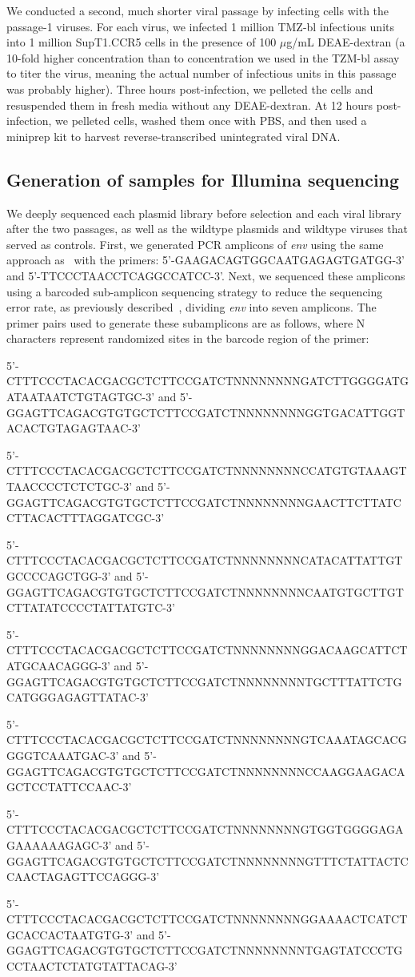 \documentclass[9pt]{elife}
\begin{document}
We conducted a second, much shorter viral passage by infecting cells with the passage-1 viruses.
For each virus, we infected 1 million TMZ-bl infectious units into 1 million SupT1.CCR5 cells in the presence of 100 $\mu$g/mL DEAE-dextran (a 10-fold higher concentration than to concentration we used in the TZM-bl assay to titer the virus, meaning the actual number of infectious units in this passage was probably higher).
Three hours post-infection, we pelleted the cells and resuspended them in fresh media without any DEAE-dextran.
At 12 hours post-infection, we pelleted cells, washed them once with PBS, and then used a miniprep kit to harvest reverse-transcribed unintegrated viral DNA.

\subsection{Generation of samples for Illumina sequencing}
We deeply sequenced each plasmid library before selection and each viral library after the two passages, as well as the wildtype plasmids and wildtype viruses that served as controls.
First, we generated PCR amplicons of \textit{env} using the same approach as~\cite{dingens2017comprehensive} with the primers: 5'-GAAGACAGTGGCAATGAGAGTGATGG-3' and 5'-TTCCCTAACCTCAGGCCATCC-3'.
Next, we sequenced these amplicons using a barcoded sub-amplicon sequencing strategy to reduce the sequencing error rate, as previously described~\cite{doud2016accurate,haddox2016experimental}, dividing \textit{env} into seven amplicons.
The primer pairs used to generate these subamplicons are as follows, where N characters represent randomized sites in the barcode region of the primer:

\begin{itemize}
{\footnotesize
\item 5'-CTTTCCCTACACGACGCTCTTCCGATCTNNNNNNNNGATCTTGGGGATGATAATAATCTGTAGTGC-3' and 5'-GGAGTTCAGACGTGTGCTCTTCCGATCTNNNNNNNNGGTGACATTGGTACACTGTAGAGTAAC-3'
\item 5'-CTTTCCCTACACGACGCTCTTCCGATCTNNNNNNNNCCATGTGTAAAGTTAACCCCTCTCTGC-3' and 5'-GGAGTTCAGACGTGTGCTCTTCCGATCTNNNNNNNNGAACTTCTTATCCTTACACTTTAGGATCGC-3'
\item 5'-CTTTCCCTACACGACGCTCTTCCGATCTNNNNNNNNCATACATTATTGTGCCCCAGCTGG-3' and 5'-GGAGTTCAGACGTGTGCTCTTCCGATCTNNNNNNNNCAATGTGCTTGTCTTATATCCCCTATTATGTC-3'
\item 5'-CTTTCCCTACACGACGCTCTTCCGATCTNNNNNNNNGGACAAGCATTCTATGCAACAGGG-3' and 5'-GGAGTTCAGACGTGTGCTCTTCCGATCTNNNNNNNNTGCTTTATTCTGCATGGGAGAGTTATAC-3'
\item 5'-CTTTCCCTACACGACGCTCTTCCGATCTNNNNNNNNGTCAAATAGCACGGGGTCAAATGAC-3' and 5'-GGAGTTCAGACGTGTGCTCTTCCGATCTNNNNNNNNCCAAGGAAGACAGCTCCTATTCCAAC-3'
\item 5'-CTTTCCCTACACGACGCTCTTCCGATCTNNNNNNNNGTGGTGGGGAGAGAAAAAAGAGC-3' and 5'-GGAGTTCAGACGTGTGCTCTTCCGATCTNNNNNNNNGTTTCTATTACTCCAACTAGAGTTCCAGGG-3'
\item 5'-CTTTCCCTACACGACGCTCTTCCGATCTNNNNNNNNGGAAAACTCATCTGCACCACTAATGTG-3' and 5'-GGAGTTCAGACGTGTGCTCTTCCGATCTNNNNNNNNTGAGTATCCCTGCCTAACTCTATGTATTACAG-3'
}
\end{itemize}
\end{document}
